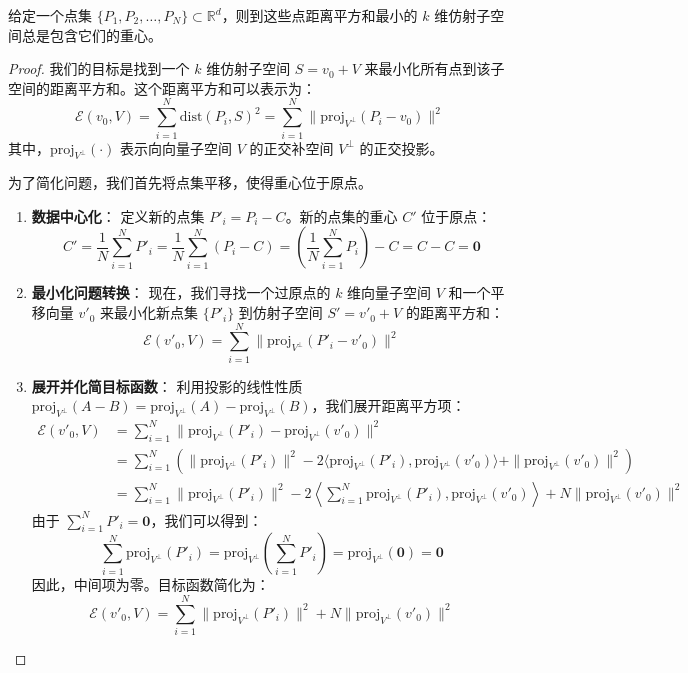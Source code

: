 \documentclass[lang=cn,newtx,10pt,scheme=chinese,chinesefont=nofont,citestyle=gb7714-2015, bibstyle=gb7714-2015]{elegantbook}
\begin{document}
\begin{refsection}
\begin{proposition}
    给定一个点集 $\{P_1, P_2, \ldots, P_N\} \subset \mathbb{R}^d$，则到这些点距离平方和最小的 $k$ 维仿射子空间总是包含它们的重心。
\end{proposition}



\begin{proof}
    我们的目标是找到一个 $k$ 维仿射子空间 $S = v_0 + V$ 来最小化所有点到该子空间的距离平方和。这个距离平方和可以表示为：
\[
\mathcal{E}(v_0, V) = \sum_{i=1}^{N} \text{dist}(P_i, S)^2 = \sum_{i=1}^{N} \| \text{proj}_{V^\perp}(P_i - v_0) \|^2 \tag{1}
\]
其中，$\text{proj}_{V^\perp}(\cdot)$ 表示向向量子空间 $V$ 的正交补空间 $V^\perp$ 的正交投影。

为了简化问题，我们首先将点集平移，使得重心位于原点。
\begin{enumerate}
    \item \textbf{数据中心化}：
    定义新的点集 $P'_i = P_i - C$。新的点集的重心 $C'$ 位于原点：
    \[
    C' = \frac{1}{N} \sum_{i=1}^{N} P'_i = \frac{1}{N} \sum_{i=1}^{N} (P_i - C) = \left( \frac{1}{N} \sum_{i=1}^{N} P_i \right) - C = C - C = \mathbf{0}
    \]

    \item \textbf{最小化问题转换}：
    现在，我们寻找一个过原点的 $k$ 维向量子空间 $V$ 和一个平移向量 $v'_0$ 来最小化新点集 $\{P'_i\}$ 到仿射子空间 $S' = v'_0 + V$ 的距离平方和：
    \[
    \mathcal{E}(v'_0, V) = \sum_{i=1}^{N} \| \text{proj}_{V^\perp}(P'_i - v'_0) \|^2
    \]

    \item \textbf{展开并化简目标函数}：
    利用投影的线性性质 $\text{proj}_{V^\perp}(A-B) = \text{proj}_{V^\perp}(A) - \text{proj}_{V^\perp}(B)$，我们展开距离平方项：
    \begin{align*}
    \mathcal{E}(v'_0, V) &= \sum_{i=1}^{N} \| \text{proj}_{V^\perp}(P'_i) - \text{proj}_{V^\perp}(v'_0) \|^2 \\
    &= \sum_{i=1}^{N} \left( \| \text{proj}_{V^\perp}(P'_i) \|^2 - 2 \langle \text{proj}_{V^\perp}(P'_i), \text{proj}_{V^\perp}(v'_0) \rangle + \| \text{proj}_{V^\perp}(v'_0) \|^2 \right) \\
    &= \sum_{i=1}^{N} \| \text{proj}_{V^\perp}(P'_i) \|^2 - 2 \left\langle \sum_{i=1}^{N} \text{proj}_{V^\perp}(P'_i), \text{proj}_{V^\perp}(v'_0) \right\rangle + N \| \text{proj}_{V^\perp}(v'_0) \|^2
    \end{align*}
    由于 $\sum_{i=1}^{N} P'_i = \mathbf{0}$，我们可以得到：
    \[
    \sum_{i=1}^{N} \text{proj}_{V^\perp}(P'_i) = \text{proj}_{V^\perp} \left( \sum_{i=1}^{N} P'_i \right) = \text{proj}_{V^\perp}(\mathbf{0}) = \mathbf{0}
    \]
    因此，中间项为零。目标函数简化为：
    \[
    \mathcal{E}(v'_0, V) = \sum_{i=1}^{N} \| \text{proj}_{V^\perp}(P'_i) \|^2 + N \| \text{proj}_{V^\perp}(v'_0) \|^2 \tag{2}
    \]


\end{enumerate}
\end{proof}
\end{refsection}
\end{document}
